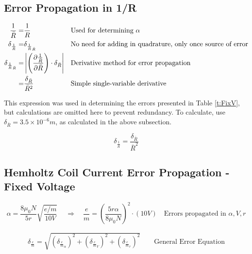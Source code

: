 \documentclass[12pt]{article}
\newcommand{\paren}[1]{\left( {#1} \right)}
\newcommand{\abs}[1]{\left| {#1} \right|}
\begin{document}
\subsection{Error Propagation in 1/R} \label{sec:InvRadiusError}

\begin{align}
	\frac{1}{\bar{R}}=& \frac{1}{R} && \text{Used for determining }\alpha \notag \\
	\delta_{\frac{1}{\bar{R}}} =& \delta_{\frac{1}{\bar{R}}_{\bar{R}}} && \text{No need for adding in quadrature, only once source of error} \notag \\
	\delta_{\frac{1}{\bar{R}}_{\bar{R}}} =& \abs{\paren{\frac{\partial \frac{1}{\bar{R}}}{\partial \bar{R}}}\cdot\delta_{\bar{R}}} && \text{Derivative method for error propagation} \label{e:R_inv_err} \\
	=& \frac{\delta_{\bar{R}}}{\bar{R}^2} && \text{Simple single-variable derivative} \notag
\end{align}

This expression was used in determining the errors presented in Table \ref{t:FixV}, but calculations are omitted here to prevent redundancy. To calculate, use $\delta_{\bar{R}}=3.5\times10^{-6} m$, as calculated in the above subsection.

\begin{equation}
	\delta_{\frac{1}{\bar{R}}}=\frac{\delta_{\bar{R}}}{\bar{R}^2}
	\label{e:R_bar_inverse_err}
\end{equation}

\clearpage

\subsection{Hemholtz Coil Current Error Propagation - Fixed Voltage} \label{sec:FixedVoltageErr}

\begin{equation}
	\alpha = \frac{8\mu_0N}{5r}\sqrt{\frac{e/m}{10V}}\
	\quad \Rightarrow \quad
	\frac{e}{m}=\paren{\frac{5r\alpha}{8\mu_0N}}^2\cdot(10V)
	\quad \text{Errors propagated in }\alpha, V, r 
	\label{e:em_derive_FixV}
\end{equation}

\begin{align}
	\delta_\frac{e}{m}=\sqrt{\paren{\delta_{\frac{e}{m}_\alpha}}^2+\paren{\delta_{\frac{e}{m}_V}}^2+\paren{\delta_{\frac{e}{m}_r}}^2} \qquad \text{General Error Equation} \label{e:FixV_err}
\end{align}
\end{document}
